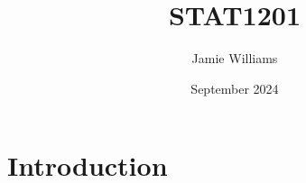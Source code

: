 \documentclass{article}
\title{STAT1201}
\author{Jamie Williams}
\date{September 2024}
\begin{document}
\maketitle

\section{Introduction}
\end{document}
